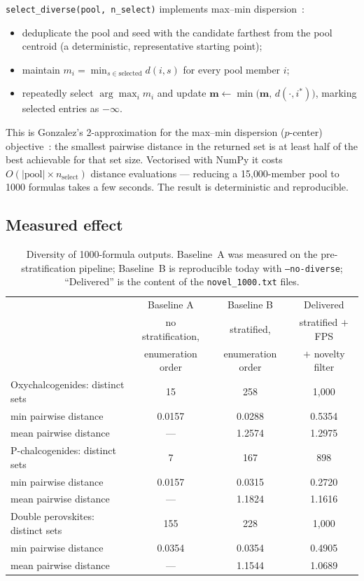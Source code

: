 \documentclass[11pt,a4paper]{article}
\newcommand{\code}[1]{\texttt{#1}}
\newcommand{\cmd}[1]{\texttt{\small #1}}
\begin{document}
\code{select\_diverse(pool, n\_select)} implements max--min dispersion~\cite{gonzalez}:
\begin{itemize}
  \item deduplicate the pool and seed with the candidate farthest from the pool centroid (a
        deterministic, representative starting point);
  \item maintain $m_i = \min_{s \in \text{selected}} d(i,s)$ for every pool member $i$;
  \item repeatedly select $\arg\max_i m_i$ and update
        $\mathbf{m} \leftarrow \min\bigl(\mathbf{m},\, d(\cdot, i^\ast)\bigr)$, marking selected
        entries as $-\infty$.
\end{itemize}
This is Gonzalez's 2-approximation for the max--min dispersion ($p$-center) objective~\cite{gonzalez}:
the smallest pairwise distance in the returned set is at least half of the best achievable for that
set size. Vectorised with NumPy it costs $O(|\text{pool}| \times n_{\text{select}})$ distance
evaluations --- reducing a 15{,}000-member pool to 1000 formulas takes a few seconds. The result is
deterministic and reproducible.

\subsection{Measured effect}

\begin{table}[h]
\centering
\small
\begin{tabular}{@{}lccc@{}}
\toprule
 & Baseline A & Baseline B & Delivered\\
 & no stratification, & stratified, & stratified $+$ FPS\\
 & enumeration order & enumeration order & $+$ novelty filter\\
\midrule
Oxychalcogenides: distinct sets &   15 &  258 & 1{,}000\\
\quad min pairwise distance     & 0.0157 & 0.0288 & 0.5354\\
\quad mean pairwise distance    & ---    & 1.2574 & 1.2975\\
\addlinespace
P-chalcogenides: distinct sets  &    7 &  167 &   898\\
\quad min pairwise distance     & 0.0157 & 0.0315 & 0.2720\\
\quad mean pairwise distance    & ---    & 1.1824 & 1.1616\\
\addlinespace
Double perovskites: distinct sets &  155 &  228 & 1{,}000\\
\quad min pairwise distance     & 0.0354 & 0.0354 & 0.4905\\
\quad mean pairwise distance    & ---    & 1.1544 & 1.0689\\
\bottomrule
\end{tabular}
\caption{Diversity of 1000-formula outputs. Baseline~A was measured on the pre-stratification
pipeline; Baseline~B is reproducible today with \cmd{--no-diverse}; ``Delivered'' is the content of
the \code{novel\_1000.txt} files.}
\label{tab:diversity}
\end{table}
\end{document}
